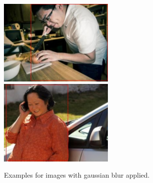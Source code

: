 \documentclass[
    headings=optiontohead,              %
    12pt,                               %
    DIV=13,                             %
    twoside=false,                      %
    open=right,                         %
    BCOR=00mm,                          %
    toc=bibliographynumbered,            %
    parskip=half,                       %
]{scrarticle}
\begin{document}
    \begin{figure}[htpb]
        \centering
        \includegraphics[width=0.5\textwidth]{../00010175.jpg}
        \includegraphics[width=0.5\textwidth]{../00016737.jpg}
        \caption{Examples for images with gaussian blur applied.}
        \label{fig:7.1_gauss}
    \end{figure}



    
\end{document}
